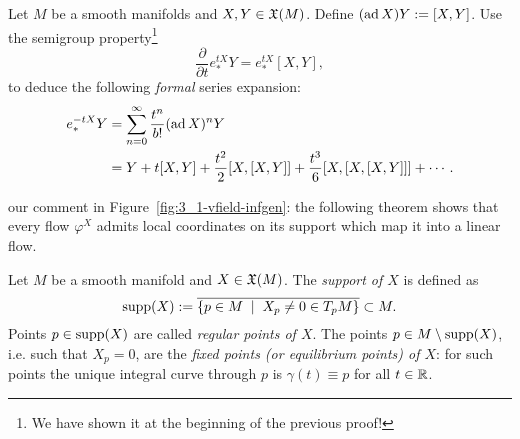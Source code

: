 \begin{exercise}
  Let $M$ be a smooth manifolds and $X,Y\in\mathfrak{X}(M)$.
  Define $(\operatorname{ad} X) Y := [X,Y]$.
  Use the semigroup property\footnote{We have shown it at the beginning of the previous proof!}
  \begin{equation}
    \frac{\partial}{\partial t} e_*^{tX} Y = e_*^{tX}[X,Y],
  \end{equation}
  to deduce the following \emph{formal} series expansion:
  \begin{align}
    e_*^{-tX} Y
     & = \sum_{n=0}^\infty \frac{t^n}{b!}(\operatorname{ad} X)^n Y                                   \\
     & = Y + t[X,Y] + \frac{t^2}{2}[X, [X, Y]] + \frac{t^3}{6} [X,[X,[X,Y]]] + \cdots.
  \end{align}
\end{exercise}

 our comment in Figure~\ref{fig:3_1-vfield-infgen}: the following theorem shows that every flow $\varphi^X$ admits local coordinates on its support which map it into a linear flow.

\begin{definition}
  Let $M$ be a smooth manifold and $X\in\mathfrak{X}(M)$.
  The \emph{support of $X$} is defined as
  \begin{equation}
    \operatorname{supp}(X):=\overline{\left\lbrace p\in M \;\mid\; X_p\neq 0 \in T_p M\right\rbrace}\subset M.
  \end{equation}
  Points $p\in\operatorname{supp}(X)$ are called \emph{regular points of $X$}.
  The points $p\in M\setminus\operatorname{supp}(X)$, i.e. such that $X_p = 0$, are the \emph{fixed points (or equilibrium points) of $X$}: for such points the unique integral curve through $p$ is $\gamma(t) \equiv p$ for all $t\in\mathbb{R}$.
\end{definition}

